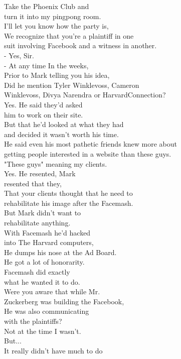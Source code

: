 \documentclass{article}
\begin{document}
\begin{multicols}{3}
Take the Phoenix Club and\\
turn it into my pingpong room.\\
I'll let you know how the party is,\\
We recognize that you're a plaintiff in one\\
suit involving Facebook and a witness in another.\\
- Yes, Sir.\\
- At any time In the weeks,\\
Prior to Mark telling you his idea,\\
Did he mention Tyler Winklevoss, Cameron\\
Winklevoss, Divya Narendra or HarvardConnection?\\
Yes. He said they'd asked\\
him to work on their site.\\
But that he'd looked at what they had\\
and decided it wasn't worth his time.\\
He said even his most pathetic friends knew more about\\
getting people interested in a website than these guys.\\
"These guys" meaning my clients.\\
Yes. He resented, Mark\\
resented that they,\\
That your clients thought that he need to\\
rehabilitate his image after the Facemash.\\
But Mark didn't want to\\
rehabilitate anything.\\
With Facemash he'd hacked\\
into The Harvard computers,\\
He dumps his nose at the Ad Board.\\
He got a lot of honorarity.\\
Facemash did exactly\\
what he wanted it to do.\\
Were you aware that while Mr.\\
Zuckerberg was building the Facebook,\\
He was also communicating\\
with the plaintiffs?\\
Not at the time I wasn't.\\
But...\\
It really didn't have much to do\\

\end{multicols}
\end{document}
